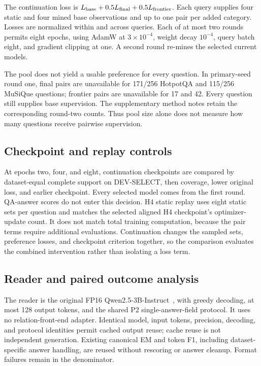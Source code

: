 \documentclass[preprint,12pt]{elsarticle}
\begin{document}
The continuation loss is $L_{\rm base}+0.5L_{\rm final}+0.5L_{\rm frontier}$. Each query supplies four static and four mined base observations and up to one pair per added category. Losses are normalized within and across queries. Each of at most two rounds permits eight epochs, using AdamW at $3\times10^{-4}$, weight decay $10^{-4}$, query batch eight, and gradient clipping at one. A second round re-mines the selected current models.

The pool does not yield a usable preference for every question. In primary-seed round one, final pairs are unavailable for 171/256 HotpotQA and 115/256 MuSiQue questions; frontier pairs are unavailable for 17 and 42. Every question still supplies base supervision. The supplementary method notes retain the corresponding round-two counts. Thus pool size alone does not measure how many questions receive pairwise supervision.

\subsection{Checkpoint and replay controls}
At epochs two, four, and eight, continuation checkpoints are compared by dataset-equal complete support on DEV-SELECT, then coverage, lower original loss, and earlier checkpoint. Every selected model comes from the first round. QA-answer scores do not enter this decision. H4 static replay uses eight static sets per question and matches the selected aligned H4 checkpoint's optimizer-update count. It does not match total training computation, because the pair terms require additional evaluations. Continuation changes the sampled sets, preference losses, and checkpoint criterion together, so the comparison evaluates the combined intervention rather than isolating a loss term.

\subsection{Reader and paired outcome analysis}
The reader is the original FP16 Qwen2.5-3B-Instruct~\cite{qwen2024release}, with greedy decoding, at most 128 output tokens, and the shared P2 single-answer-field protocol. It uses no relation-front-end adapter. Identical model, input tokens, precision, decoding, and protocol identities permit cached output reuse; cache reuse is not independent generation. Existing canonical EM and token F1, including dataset-specific answer handling, are reused without rescoring or answer cleanup. Format failures remain in the denominator.
\end{document}
